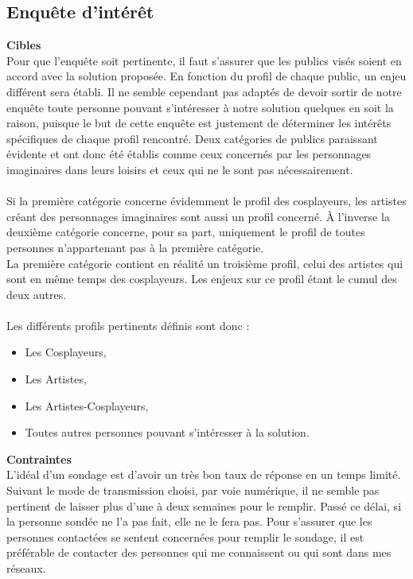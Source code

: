 \documentclass[a4paper,12pt]{article}
\begin{document}
\subsection{Enquête d'intérêt}
\textbf{Cibles} \\
Pour que l’enquête soit pertinente, il faut s’assurer que les publics visés soient en accord avec la solution proposée. En fonction du profil de chaque public, un enjeu différent sera établi.
Il ne semble cependant pas adaptés de devoir sortir de notre enquête toute personne pouvant s’intéresser à notre solution quelques en soit la raison, puisque le but de cette enquête est justement de déterminer les intérêts spécifiques de chaque profil rencontré.
Deux catégories de publics paraissant évidente et ont donc été établis comme ceux concernés par les personnages imaginaires dans leurs loisirs et ceux qui ne le sont pas nécessairement.\\ \\
Si la première catégorie concerne évidemment le profil des cosplayeurs, les artistes créant des personnages imaginaires sont aussi un profil concerné. À l’inverse la deuxième catégorie concerne, pour sa part, uniquement le profil de toutes personnes n’appartenant pas à la première catégorie. \\
La première catégorie contient en réalité un troisième profil, celui des artistes qui sont en même temps des cosplayeurs. Les enjeux sur ce profil étant le cumul des deux autres.
\\ \\
Les différents profils pertinents définis sont donc :
\begin{itemize}
    \item Les Cosplayeurs,
    \item Les Artistes,
    \item Les Artistes-Cosplayeurs,
    \item Toutes autres personnes pouvant s'intéresser à la solution. \\
\end{itemize} 


\textbf{Contraintes} \\
L’idéal d’un sondage est d’avoir un très bon taux de réponse en un temps limité. Suivant le mode de transmission choisi, par voie numérique, il ne semble pas pertinent de laisser plus d’une à deux semaines pour le remplir. Passé ce délai, si la personne sondée ne l’a pas fait, elle ne le fera pas. Pour s’assurer que les personnes contactées se sentent concernées pour remplir le sondage, il est préférable de contacter des personnes qui me connaissent ou qui sont dans mes réseaux.
\\ 
\end{document}
